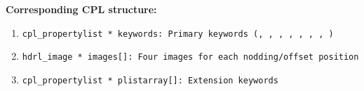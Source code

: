\begin{datastructdef}
\textbf{Corresponding \ac{CPL} structure:}
\begin{enumerate}
    \item \texttt{cpl\_propertylist * keywords: Primary keywords (,  ,  ,  ,  ,  , , )}
    \item \texttt{hdrl\_image * images[]: Four images for each nodding/offset position}
    \item \texttt{cpl\_propertylist * plistarray[]: Extension keywords}
\end{enumerate}
\end{datastructdef}


